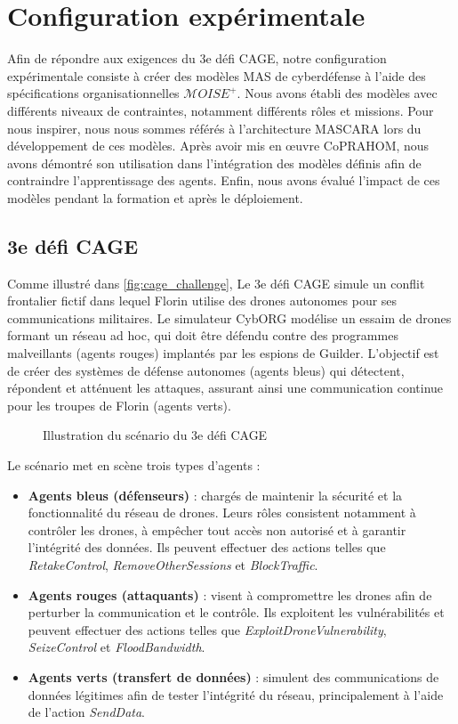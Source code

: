 \section{Configuration expérimentale}\label{sec:experimental_setup}

Afin de répondre aux exigences du 3e défi CAGE, notre configuration expérimentale consiste à créer des modèles MAS de cyberdéfense à l'aide des spécifications organisationnelles $\mathcal{M}OISE^+$. Nous avons établi des modèles avec différents niveaux de contraintes, notamment différents rôles et missions. Pour nous inspirer, nous nous sommes référés à l'architecture MASCARA lors du développement de ces modèles. Après avoir mis en œuvre CoPRAHOM, nous avons démontré son utilisation dans l'intégration des modèles définis afin de contraindre l'apprentissage des agents. Enfin, nous avons évalué l'impact de ces modèles pendant la formation et après le déploiement.

\subsection{3e défi CAGE}

Comme illustré dans \autoref{fig:cage_challenge},
Le 3e défi CAGE simule un conflit frontalier fictif dans lequel Florin utilise des drones autonomes pour ses communications militaires. Le simulateur CybORG modélise un essaim de drones formant un réseau ad hoc, qui doit être défendu contre des programmes malveillants (agents rouges) implantés par les espions de Guilder. L'objectif est de créer des systèmes de défense autonomes (agents bleus) qui détectent, répondent et atténuent les attaques, assurant ainsi une communication continue pour les troupes de Florin (agents verts).

\begin{figure}
    \centering
    
    \caption{Illustration du scénario du 3e défi CAGE}\label{fig:cage_challenge}
\end{figure}

Le scénario met en scène trois types d'agents :
\begin{itemize}
    \item \textbf{Agents bleus (défenseurs)} : chargés de maintenir la sécurité et la fonctionnalité du réseau de drones. Leurs rôles consistent notamment à contrôler les drones, à empêcher tout accès non autorisé et à garantir l'intégrité des données. Ils peuvent effectuer des actions telles que \textit{RetakeControl}, \textit{RemoveOtherSessions} et \textit{BlockTraffic}.
    \item \textbf{Agents rouges (attaquants)} : visent à compromettre les drones afin de perturber la communication et le contrôle. Ils exploitent les vulnérabilités et peuvent effectuer des actions telles que \textit{ExploitDroneVulnerability}, \textit{SeizeControl} et \textit{FloodBandwidth}.
    \item \textbf{Agents verts (transfert de données)} : simulent des communications de données légitimes afin de tester l'intégrité du réseau, principalement à l'aide de l'action \textit{SendData}.
\end{itemize}

